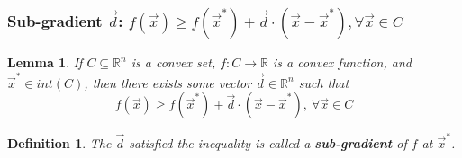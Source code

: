 \documentclass[11pt,a4paper]{article}
\newtheorem{lemma}{Lemma}
\newtheorem{definition}{Definition}
\begin{document}
\subsubsection{Sub-gradient $\vec{d}$: $f(\vec{x})\geq f(\vec{x}^*)+\vec{d}\cdot (\vec{x}-\vec{x}^*), \forall \vec{x}\in C$}
\begin{lemma}
    If $C\subseteq \mathbb{R}^n$ is a convex set, $f: C \rightarrow  \mathbb{R}$ is a convex function, and $\vec{x}^*\in int(C)$, then there exists some vector $\vec{d}\in \mathbb{R}^n$ such that $$f(\vec{x})\geq f(\vec{x}^*)+\vec{d}\cdot (\vec{x}-\vec{x}^*),\ \forall \vec{x}\in C$$
\end{lemma}
\begin{definition}
    The $\vec{d}$ satisfied the inequality is called a \textbf{sub-gradient} of $f$ at $\vec{x}^*$.
\end{definition}
\end{document}
